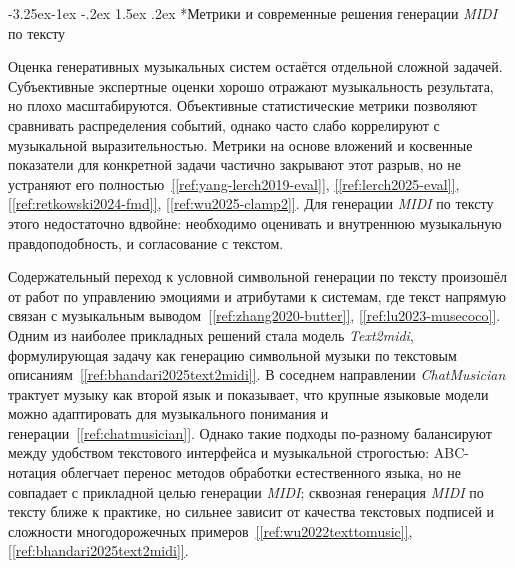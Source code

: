 \documentclass[a4paper,12pt]{extarticle}
\makeatletter
\newcommand{\sourcecite}[1]{\hyperref[#1]{[\ref*{#1}]}}
\renewcommand\subsection{\@startsection{subsection}{2}{\z@}%
  {-3.25ex\@plus -1ex \@minus -.2ex}%
  {1.5ex \@plus .2ex}%
  {\normalfont\large\bfseries\Needspace{6\baselineskip}}}
\makeatother
\begin{document}
\subsection*{Метрики и современные решения генерации \textit{MIDI} по тексту}

Оценка генеративных музыкальных систем остаётся отдельной сложной задачей. Субъективные экспертные оценки хорошо отражают музыкальность результата, но плохо масштабируются. Объективные статистические метрики позволяют сравнивать распределения событий, однако часто слабо коррелируют с музыкальной выразительностью. Метрики на основе вложений и косвенные показатели для конкретной задачи частично закрывают этот разрыв, но не устраняют его полностью~\sourcecite{ref:yang-lerch2019-eval}, \sourcecite{ref:lerch2025-eval}, \sourcecite{ref:retkowski2024-fmd}, \sourcecite{ref:wu2025-clamp2}. Для генерации \textit{MIDI} по тексту этого недостаточно вдвойне: необходимо оценивать и внутреннюю музыкальную правдоподобность, и согласование с текстом.

Содержательный переход к условной символьной генерации по тексту произошёл от работ по управлению эмоциями и атрибутами к системам, где текст напрямую связан с музыкальным выводом~\sourcecite{ref:zhang2020-butter}, \sourcecite{ref:lu2023-musecoco}. Одним из наиболее прикладных решений стала модель \textit{Text2midi}, формулирующая задачу как генерацию символьной музыки по текстовым описаниям~\sourcecite{ref:bhandari2025text2midi}. В соседнем направлении \textit{ChatMusician} трактует музыку как второй язык и показывает, что крупные языковые модели можно адаптировать для музыкального понимания и генерации~\sourcecite{ref:chatmusician}. Однако такие подходы по-разному балансируют между удобством текстового интерфейса и музыкальной строгостью: ABC-нотация облегчает перенос методов обработки естественного языка, но не совпадает с прикладной целью генерации \textit{MIDI}; сквозная генерация \textit{MIDI} по тексту ближе к практике, но сильнее зависит от качества текстовых подписей и сложности многодорожечных примеров~\sourcecite{ref:wu2022texttomusic}, \sourcecite{ref:bhandari2025text2midi}.
\end{document}

